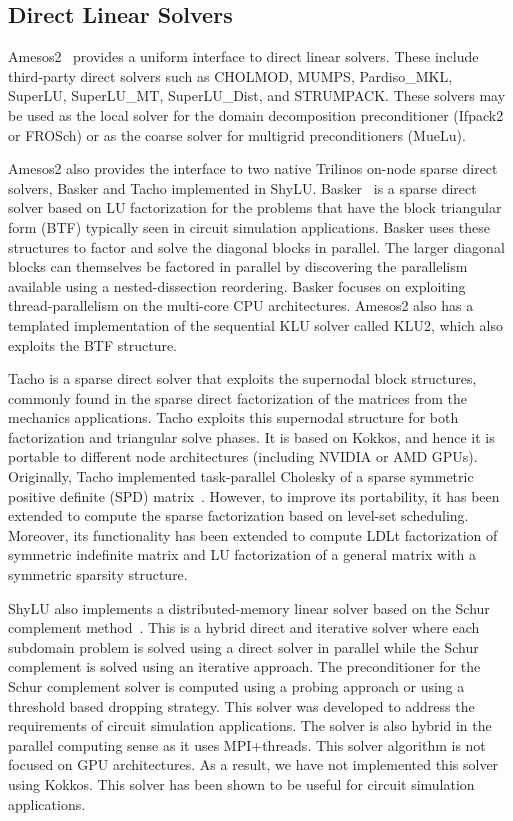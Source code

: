 \subsection{Direct Linear Solvers}

Amesos2~\cite{Bavier2012a} provides a uniform interface to direct linear solvers.
These include third-party direct solvers such as CHOLMOD, MUMPS, Pardiso\_MKL, SuperLU, SuperLU\_MT, SuperLU\_Dist, and STRUMPACK.
These solvers may be used as the local solver for the domain decomposition preconditioner (Ifpack2 or FROSch)
or as the coarse solver for multigrid preconditioners (MueLu).

Amesos2 also provides the interface to two native Trilinos on-node sparse direct solvers, Basker and Tacho implemented in ShyLU.
Basker~\cite{Basker2017} is a sparse direct solver based on LU factorization for the problems that have the block triangular form (BTF) typically seen in circuit simulation applications. Basker uses these structures to factor and solve the diagonal blocks in parallel. The larger diagonal blocks can themselves be factored in parallel by discovering the parallelism available using a nested-dissection reordering. Basker focuses on exploiting thread-parallelism on the multi-core CPU architectures. %
Amesos2 also has a templated implementation of the sequential KLU solver called KLU2, which also exploits the BTF structure.


Tacho is a sparse direct solver that exploits the supernodal block structures, commonly found in the sparse direct factorization of the matrices from the mechanics applications. Tacho exploits this supernodal structure for both factorization and triangular solve phases.  It is based on Kokkos, and hence it is portable to different node architectures (including NVIDIA or AMD GPUs). Originally, Tacho implemented task-parallel Cholesky of a sparse symmetric positive definite (SPD) matrix~\cite{Tacho2018}. However, to improve its portability, it has been extended to compute the sparse factorization based on level-set scheduling. Moreover, its functionality has been extended to compute LDLt factorization of symmetric indefinite matrix and LU factorization of a general matrix with a symmetric sparsity structure.


ShyLU also implements a distributed-memory linear solver based on the Schur complement method~\cite{ShyLUCore2014}. This is a hybrid direct and iterative solver where each subdomain problem is solved using a direct solver in parallel while the Schur complement is solved using an iterative approach. The preconditioner for the Schur complement solver is computed using a probing approach or using a threshold based dropping strategy. This solver was developed to address the requirements of circuit simulation applications. The solver is also hybrid in the parallel computing sense as it uses MPI+threads. This  solver algorithm is not focused on GPU architectures. As a result, we have not implemented this solver using Kokkos. This solver has been shown to be useful for circuit simulation applications.


